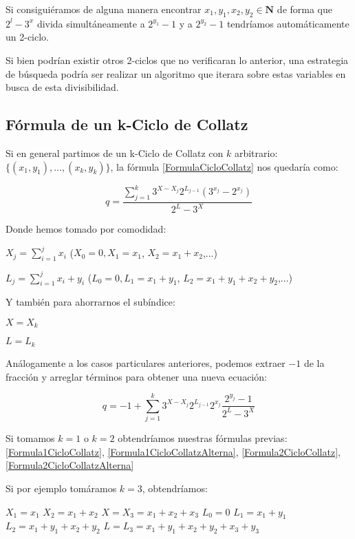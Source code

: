 Si consiguiéramos de alguna manera encontrar $x_1,y_1,x_2,y_2 \in \mathbf{N}$ de forma que $2^l-3^x$ divida simultáneamente a $2^{y_1}-1$ y a $2^{y_2}-1$ tendríamos automáticamente un 2-ciclo.

Si bien podrían existir otros 2-ciclos que no verificaran lo anterior, una estrategia de búsqueda podría ser realizar un algoritmo que iterara sobre estas variables en busca de esta divisibilidad.




\subsection{Fórmula de un k-Ciclo de Collatz}
Si en general partimos de un k-Ciclo de Collatz con $k$ arbitrario: $\{ (x_1, y_1), ..., (x_{k},y_{k}) \}$, la fórmula \ref{FormulaCicloCollatz} nos quedaría como:

\begin{equation}
    \label{FormulakCicloCollatz}
        q = \frac{\sum\limits_{j=1}^k 3^{X-X_j}2^{L_{j-1}}(3^{x_j}-2^{x_j})}{2^L-3^X} 
\end{equation}

Donde hemos tomado por comodidad:

$X_j = \sum\limits_{i=1}^j x_i$ ($X_0=0, X_1=x_1$, $X_2=x_1+x_2$,...)

$L_j = \sum\limits_{i=1}^j x_i + y_i$ ($L_0=0, L_1=x_1+y_1$, $L_2=x_1+y_1+x_2+y_2$,...)

Y también para ahorrarnos el subíndice:

$X=X_k$

$L=L_k$

Análogamente a los casos particulares anteriores, podemos extraer $-1$ de la fracción y arreglar términos para obtener una nueva ecuación:


\begin{equation}
    \label{FormulakCicloCollatzAlterna}
        q = -1 + \sum_{j=1}^k 3^{X-X_j} 2^{L_{j-1}} 2^{x_j} \frac{2^{y_j}-1}{2^L-3^X}
\end{equation}

Si tomamos $k=1$ o $k=2$ obtendríamos nuestras fórmulas previas: \ref{Formula1CicloCollatz}, \ref{Formula1CicloCollatzAlterna}, \ref{Formula2CicloCollatz}, \ref{Formula2CicloCollatzAlterna}

Si por ejemplo tomáramos $k=3$, obtendríamos:

$X_1=x_1$
$X_2=x_1+x_2$
$X=X_3=x_1+x_2+x_3$
$L_0=0$
$L_1=x_1+y_1$
$L_2=x_1+y_1+x_2+y_2$
$L=L_3=x_1+y_1+x_2+y_2+x_3+y_3$

